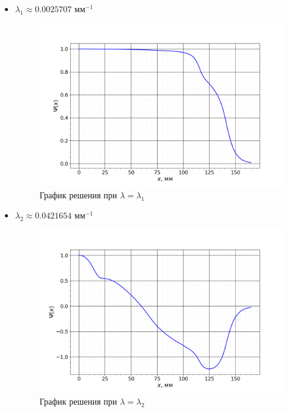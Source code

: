 		\begin{itemize}
			\item $\lambda_1 \approx 0.0025707$ мм$^{-1}$
			\begin{figure}[h!]
				\centering
				\includegraphics[width=0.92\linewidth]{Pictures/Normal/1.png}
				\caption{График решения при $\lambda = \lambda_1$}
			\end{figure}
		
			\newpage
			\item $\lambda_2 \approx 0.0421654$ мм$^{-1}$
			\begin{figure}[h!]
				\centering
				\includegraphics[width=0.92\linewidth]{Pictures/Normal/2.png}
				\caption{График решения при $\lambda = \lambda_2$}
			\end{figure}
		

\end{itemize}
